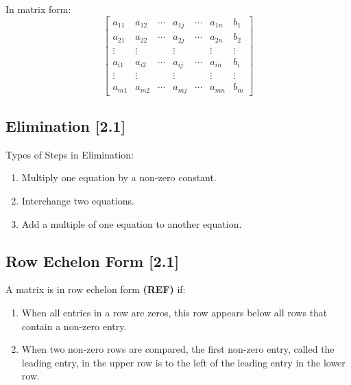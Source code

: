 \documentclass[a4paper,9pt]{extarticle}
\begin{document}
\begin{multicols*}{2}
In matrix form:
\begin{equation} \label{2.1-2}
    \left[
    \begin{array}{cccccc|c}
        a_{11} & a_{12} & \cdots & a_{1j} & \cdots & a_{1n} & b_1 \\ 
        a_{21} & a_{22} & \cdots & a_{2j} & \cdots & a_{2n} & b_2 \\
        \vdots & \vdots & \ & \vdots & \ & \vdots & \vdots \\
        a_{i1} & a_{i2} & \cdots & a_{ij} & \cdots & a_{in} & b_i \\
        \vdots & \vdots & \ & \vdots & \ & \vdots & \vdots \\
        a_{m1} & a_{m2} & \cdots & a_{mj} & \cdots & a_{mn} & b_m
    \end{array}
    \right]
\end{equation}


\subsection{Elimination [2.1]}
Types of Steps in Elimination:
\begin{enumerate}[label=\bfseries (\arabic*)] \itemsep0pt \parskip0pt 
    \item Multiply one equation by a non-zero constant.
    \item Interchange two equations.
    \item Add a multiple of one equation to another equation.
\end{enumerate}


\subsection{Row Echelon Form [2.1]}
A matrix is in row echelon form \textbf{(REF)} if:
\begin{enumerate}[label=\bfseries (\arabic*)] \itemsep0pt \parskip0pt 
    \item When all entries in a row are zeros, this row appears below all rows that contain
a non-zero entry.
    \item When two non-zero rows are compared, the first non-zero entry, called the leading entry, in the upper row is to the left of the leading entry in the lower row.
\end{enumerate}


\end{multicols*}
\end{document}
